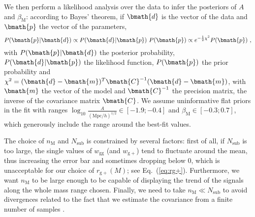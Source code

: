 \documentclass[a4paper,fleqn,usenatbib]{mnras}
\begin{document}
We then perform a likelihood analysis over the data to infer the posteriors of $A$ and $\beta_{\mathrm{M}}$: according to Bayes' theorem, if $\bmath{d}$ is the vector of the data and $\bmath{p}$ the vector of the parameters, 
\begin{equation}
    P(\bmath{p} | \bmath{d}) \propto P(\bmath{d} | \bmath{p}) \ P(\bmath{p}) \propto e^{-\frac{1}{2} \chi ^2} P(\bmath{p}) \ ,
	\label{eq:bayes}
\end{equation}
with $P(\bmath{p} | \bmath{d})$ the posterior probability, $P(\bmath{d} | \bmath{p})$ the likelihood function, $P(\bmath{p})$ the prior probability and $\chi ^2 = (\bmath{d} - \bmath{m})^T \bmath{C}^{-1} (\bmath{d} - \bmath{m})$, with $\bmath{m}$ the vector of the model and $\bmath{C}^{-1}$ the precision matrix, the inverse of the covariance matrix $\bmath{C}$. We assume uninformative flat priors in the fit with ranges $\log_{10} \frac{A}{({\mathrm{Mpc}/h})^{1/2}} \in [-1.9;-0.4]$ and $\beta_{\mathrm{M}} \in [-0.3;0.7]$, which generously include the range around the best-fit values. 

The choice of $n_\mathrm{M}$ and $N_\mathrm{sub}$ is constrained by several factors: first of all, if $N_\mathrm{sub}$ is too large, the single values of $w_{\mathrm{gg}}$ (and $w_{\mathrm{g+}}$) tend to fluctuate around the mean, thus increasing the error bar and sometimes dropping below 0, which is unacceptable for our choice of $ r_{\mathrm{g+}} (M)$; see Eq.~(\ref{eq:rg+}). Furthermore, we want $n_\mathrm{M}$ to be large enough to be capable of displaying the trend of the signals along the whole mass range chosen. Finally, we need to take $n_\mathrm{M} \ll N_\mathrm{sub}$ to avoid divergences related to the fact that we estimate the covariance from a finite number of samples \citep{Tayloretal2013}.
\end{document}
